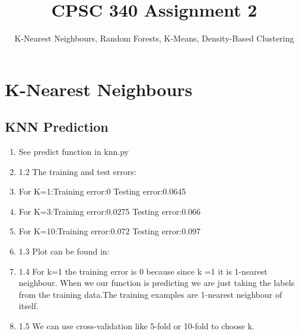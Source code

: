 \documentclass{article}
\begin{document}
\def\blu#1{{\color{blu}#1}}
\def\gre#1{{\color{gre}#1}}
\def\red#1{{\color{red}#1}}
\def\norm#1{\|#1\|}
\newcommand{\argmin}[1]{\mathop{\hbox{argmin}}_{#1}}
\newcommand{\argmax}[1]{\mathop{\hbox{argmax}}_{#1}}
\def\R{\mathbb{R}}
\newcommand{\fig}[2]{\texttt{[image: \#2]}}
\newcommand{\centerfig}[2]{\begin{center}\texttt{[image: \#2]}\end{center}}
\def\items#1{\begin{itemize}#1\end{itemize}}
\def\enum#1{\begin{enumerate}#1\end{enumerate}}
\def\answer#1{\iftoggle{answers}{\blu{Answer}:\\#1}}
\def\rubric#1{Rubric: \{#1\}}{}
\newcommand{\code}[1]{}


\title{CPSC 340 Assignment 2}
\author{K-Nearest Neighbours, Random Forests, K-Means, Density-Based Clustering}
\date{}
\maketitle

\section{K-Nearest Neighbours}
\subsection{KNN Prediction}
\begin{enumerate}
\item See predict function in knn.py
\item 1.2 The training and test errors:
\item For K=1:Training error:0 Testing error:0.0645
\item For K=3:Training error:0.0275 Testing error:0.066
\item For K=10:Training error:0.072 Testing error:0.097
\item 1.3 Plot can be found in:
\item 1.4 For k=1 the training error is 0 because since k =1 it is 1-nearest neighbour. When
we our function is predicting we are just taking the labels from the training data.The training
examples are 1-nearest neighbour of itself.
\item 1.5 We can use cross-validation like 5-fold or 10-fold to choose k.
\end{enumerate}
\end{document}
